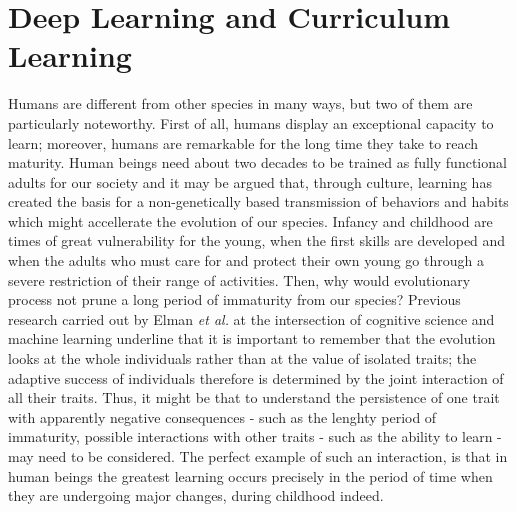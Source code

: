 \chapter{Deep Learning and Curriculum Learning}
Humans are different from other species in many ways, but two of them are particularly noteworthy. 
First of all, humans display an exceptional capacity to learn;
moreover, humans are remarkable for the long time they take to reach maturity. Human beings need about two decades to be trained as fully functional adults for our society and it may
be argued that, through culture, learning has created the basis for a non-genetically based transmission of behaviors and habits which might
accellerate the evolution of our species. Infancy and childhood are times of great vulnerability for the young, when the first skills are developed and when the adults who
must care for and protect their own young go through a severe restriction of their range of activities. Then, why would evolutionary process not prune a long period of 
immaturity from our species? Previous research carried out by Elman \textit{et al.}\cite{Elman1} at the intersection of cognitive science
and machine learning underline that it is important to remember that the evolution looks at the whole individuals rather than at the value of isolated traits; the adaptive success of individuals therefore is 
determined by the joint interaction of all their traits. Thus, it might be that to understand the persistence of one trait with apparently negative consequences - such as the lenghty period of immaturity, possible interactions
with other traits - such as the ability to learn - may need to be considered. The perfect example of such an interaction, is that in human beings the greatest learning occurs precisely in the period of time
when they are undergoing major changes, during childhood indeed.\\

